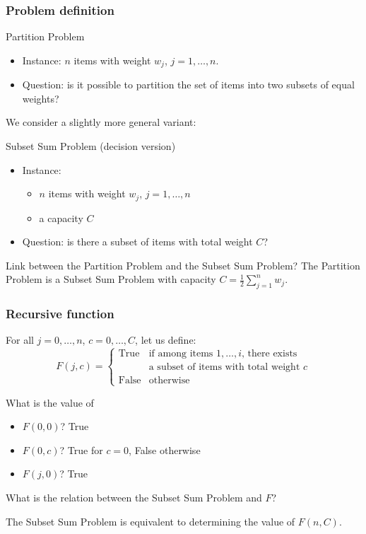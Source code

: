 \documentclass{beamer}
\begin{document}
\begin{frame}
  \frametitle{Problem definition}

  \begin{block}{Partition Problem}
    \begin{itemize}
      \item Instance: $n$ items with weight \alert{$w_j$}, $j = 1, \dots, n$.
      \item Question: is it possible to partition the set of items into two subsets of equal weights?
    \end{itemize}
  \end{block}

  \pause

  We consider a slightly more general variant:
  \begin{block}{Subset Sum Problem (decision version)}
    \begin{itemize}
      \item Instance:
        \begin{itemize}
          \item $n$ items with weight \alert{$w_j$}, $j = 1, \dots, n$
          \item a capacity \alert{$C$}
        \end{itemize}
      \item Question: is there a subset of items with total weight $C$?
    \end{itemize}
  \end{block}

  \pause
  Link between the Partition Problem and the Subset Sum Problem?
  \pause
  The Partition Problem is a Subset Sum Problem with capacity $C = \frac{1}{2} \sum_{j = 1}^n w_j$.
\end{frame}

\begin{frame}
  \frametitle{Recursive function}

  For all $j = 0, \dots, n$, $c = 0, \dots, C$, let us define:
  \begin{displaymath}
    F(j, c) =
    \left\{
      \begin{array}{ll}
        \text{True} & \text{if among items $1, \dots, i$, there exists} \\
        & \text{a subset of items with total weight $c$} \\
        \text{False} & \text{otherwise}
      \end{array}
    \right.
  \end{displaymath}

  \pause
  What is the value of
  \begin{itemize}
    \item $F(0, 0)$? \pause True \pause
    \item $F(0, c)$? \pause True for $c = 0$, False otherwise \pause
    \item $F(j, 0)$? \pause True \pause
  \end{itemize}

  What is the relation between the Subset Sum Problem and $F$? \pause

  The Subset Sum Problem is equivalent to determining the value of $F(n, C)$.
\end{frame}
\end{document}
